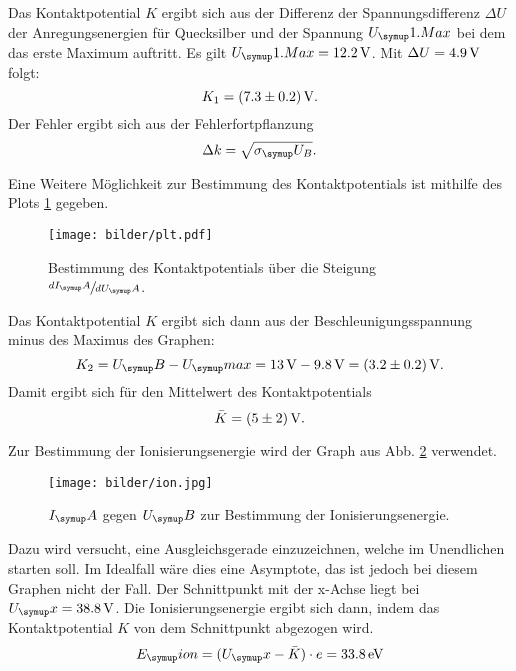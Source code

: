 Das Kontaktpotential $K$ ergibt sich aus der Differenz der Spannungsdifferenz $\Delta U$
der Anregungsenergien für Quecksilber und der Spannung $U_\su{1.Max}$ bei dem das
erste Maximum auftritt. Es gilt $U_\su{1.Max} = 12.2\Volt$. Mit $\Delta U = 4.9\,\si{\volt}$
folgt:
\begin{equation}
  K_1 = (7.3\pm0.2)\,\si{\volt}.
\end{equation}
Der Fehler ergibt sich aus der Fehlerfortpflanzung
\begin{equation}
  \Delta k = \sqrt{\sigma_\su{U_B}}.
\end{equation}

Eine Weitere Möglichkeit zur Bestimmung des Kontaktpotentials ist mithilfe
des Plots \ref{fig:plot} gegeben.
\begin{figure}
  \centering
  \texttt{[image: bilder/plt.pdf]}
  \caption{Bestimmung des Kontaktpotentials über die Steigung $\sfrac{dI_\su{A}}{dU_\su{A}}$.}
  \label{fig:plot}
\end{figure}
Das Kontaktpotential $K$ ergibt sich dann aus der Beschleunigungsspannung minus
des Maximus des Graphen:
\begin{equation}
  K_2 = U_\su{B} - U_\su{max} = 13\Volt - 9.8\Volt = (3.2\pm0.2)\Volt.
\end{equation}
Damit ergibt sich für den Mittelwert des Kontaktpotentials
\begin{equation}
  \bar{K} = (5 \pm 2) \,\si{\volt}.
\end{equation}

Zur Bestimmung der Ionisierungsenergie wird der Graph aus Abb. \ref{fig:ion}
verwendet.
\begin{figure}
  \centering
  \texttt{[image: bilder/ion.jpg]}
  \caption{$I_\su{A}$ gegen $U_\su{B}$ zur Bestimmung der Ionisierungsenergie.}
  \label{fig:ion}
\end{figure}
Dazu wird versucht, eine Ausgleichsgerade einzuzeichnen, welche im Unendlichen starten
soll. Im Idealfall wäre dies eine Asymptote, das ist jedoch bei diesem Graphen nicht
der Fall. Der Schnittpunkt mit der x-Achse liegt bei $U_\su{x} = 38.8 \Volt$.
Die Ionisierungsenergie ergibt sich dann, indem das Kontaktpotential $K$ von
dem Schnittpunkt abgezogen wird.
\begin{equation}
  E_\su{ion} = (U_\su{x}-\bar{K}) \cdot e = 33.8\eV
\end{equation}
